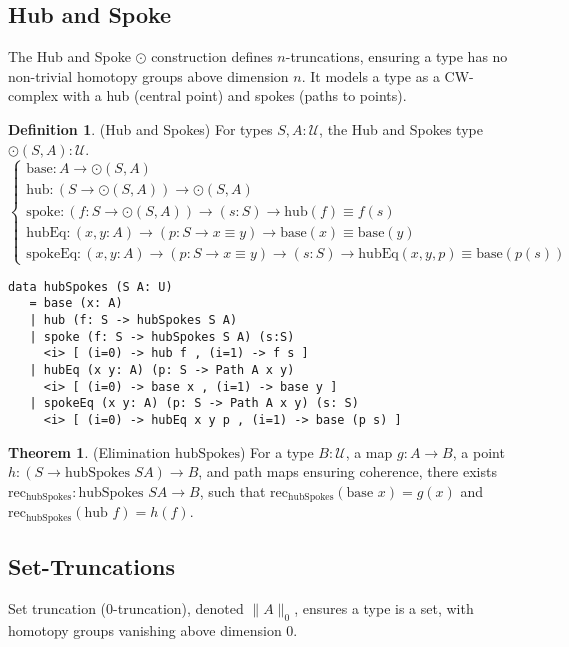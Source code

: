 \documentclass{article}
\theoremstyle{definition}
\newtheorem{theorem}{Theorem}
\newtheorem{definition}{Definition}
\begin{document}
\newpage
\subsection{Hub and Spoke}
The Hub and Spoke $\odot$ construction defines $n$-truncations,
ensuring a type has no non-trivial homotopy groups above
dimension $n$. It models a type as a CW-complex with a
hub (central point) and spokes (paths to points).

\begin{definition} (Hub and Spokes)
For types $S, A : \mathcal{U}$, the Hub and Spokes type $\odot(S,A) : \mathcal{U}$.
\[
\begin{cases}
\text{base} : A \to \odot(S,A) \\
\text{hub} : (S \to \odot(S,A)) \to \odot(S,A) \\
\text{spoke} : (f : S \to \odot(S,A)) \to (s : S) \to \text{hub}(f) \equiv f(s) \\
\text{hubEq} : (x, y : A) \to (p : S \to x \equiv y) \to \text{base}(x) \equiv \text{base}(y) \\
\text{spokeEq} : (x, y : A) \to (p : S \to x \equiv y) \to (s : S) \to \text{hubEq}(x,y,p) \equiv \text{base}(p(s))
\end{cases}
\]
\begin{lstlisting}
data hubSpokes (S A: U)
   = base (x: A)
   | hub (f: S -> hubSpokes S A)
   | spoke (f: S -> hubSpokes S A) (s:S)
     <i> [ (i=0) -> hub f , (i=1) -> f s ]
   | hubEq (x y: A) (p: S -> Path A x y)
     <i> [ (i=0) -> base x , (i=1) -> base y ]
   | spokeEq (x y: A) (p: S -> Path A x y) (s: S)
     <i> [ (i=0) -> hubEq x y p , (i=1) -> base (p s) ]
\end{lstlisting}
\end{definition}

\begin{theorem} (Elimination $\text{hubSpokes}$)
For a type $B : \mathcal{U}$, a map $g : A \to B$,
a point $h : (S \to \text{hubSpokes } S A) \to B$,
and path maps ensuring coherence, there exists
$\text{rec}_{\text{hubSpokes}} : \text{hubSpokes } S A \to B$,
such that $\text{rec}_{\text{hubSpokes}}(\text{base } x) = g(x)$
and $\text{rec}_{\text{hubSpokes}}(\text{hub } f) = h(f)$.
\end{theorem}

\newpage
\subsection{Set-Truncations}
Set truncation (0-truncation), denoted $\| A \|_0$,
ensures a type is a set, with homotopy groups vanishing above dimension 0.
\end{document}
